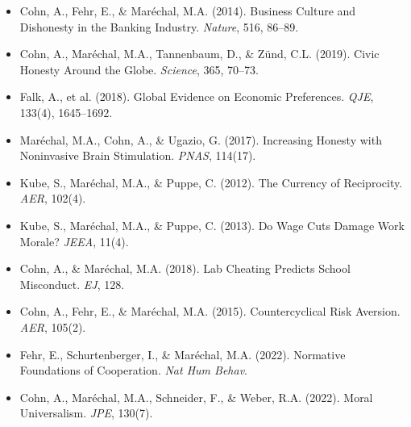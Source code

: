 \begin{itemize}
    \item Cohn, A., Fehr, E., \& Maréchal, M.A. (2014). Business Culture and Dishonesty in the Banking Industry. \textit{Nature}, 516, 86--89.
    \item Cohn, A., Maréchal, M.A., Tannenbaum, D., \& Zünd, C.L. (2019). Civic Honesty Around the Globe. \textit{Science}, 365, 70--73.
    \item Falk, A., et al. (2018). Global Evidence on Economic Preferences. \textit{QJE}, 133(4), 1645--1692.
    \item Maréchal, M.A., Cohn, A., \& Ugazio, G. (2017). Increasing Honesty with Noninvasive Brain Stimulation. \textit{PNAS}, 114(17).
    \item Kube, S., Maréchal, M.A., \& Puppe, C. (2012). The Currency of Reciprocity. \textit{AER}, 102(4).
    \item Kube, S., Maréchal, M.A., \& Puppe, C. (2013). Do Wage Cuts Damage Work Morale? \textit{JEEA}, 11(4).
    \item Cohn, A., \& Maréchal, M.A. (2018). Lab Cheating Predicts School Misconduct. \textit{EJ}, 128.
    \item Cohn, A., Fehr, E., \& Maréchal, M.A. (2015). Countercyclical Risk Aversion. \textit{AER}, 105(2).
    \item Fehr, E., Schurtenberger, I., \& Maréchal, M.A. (2022). Normative Foundations of Cooperation. \textit{Nat Hum Behav}.
    \item Cohn, A., Maréchal, M.A., Schneider, F., \& Weber, R.A. (2022). Moral Universalism. \textit{JPE}, 130(7).
\end{itemize}



